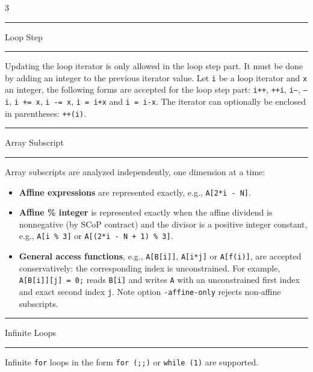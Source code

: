 \documentclass[landscape,a4paper]{article}
\def\titre#1{\begin{center}\hrule\vspace{0.1cm}#1
\vspace{0.07cm}\hrule\end{center}}
\begin{document}
\begin{multicols}{3}
\begin{small}
\end{small}

\titre{Loop Step}

\begin{small}
Updating the loop iterator is only allowed in the loop step part.
It must be done by adding an integer to the previous
iterator value. Let {\tt i} be a loop iterator and {\tt x} an integer,
the following forms are accepted for the loop step part:
{\tt i++}, {\tt ++i}, {\tt i---}, {\tt ---i}, {\tt i += x}, {\tt i -= x}, {\tt i = i+x} and
{\tt i = i-x}. The iterator can optionally be enclosed
in parentheses: {\tt ++(i)}.
\end{small}

\titre{Array Subscript}

\begin{small}
Array subscripts are analyzed independently, one dimension at a time:
\begin{itemize}
\item \textbf{Affine expressions} are represented exactly, e.g.,
      {\tt A[2*i - N]}.
\item \textbf{Affine \% integer} is represented exactly when the affine
      dividend is nonnegative (by SCoP contract) and the divisor is a
      positive integer constant, e.g., {\tt A[i \% 3]} or
      {\tt A[(2*i - N + 1) \% 3]}.
\item \textbf{General access functions}, e.g., {\tt A[B[i]]},
      {\tt A[i*j]} or {\tt A[f(i)]}, are accepted conservatively:
      the corresponding index is unconstrained. For example,
      {\tt A[B[i]][j] = 0;} reads {\tt B[i]} and writes {\tt A} with
      an unconstrained first index and exact second index {\tt j}.
      Note option {\tt -affine-only} rejects non-affine subscripts.
\end{itemize}
\end{small}

\titre{Infinite Loops}

\begin{small}
Infinite {\tt for} loops in the form {\tt for (;;)} or {\tt while (1)} are
supported.
\end{small}

\end{multicols}
\end{document}
